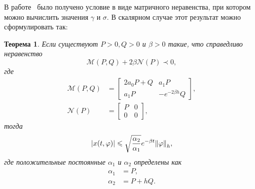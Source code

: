 \documentclass[a4paper,14pt]{article}
\newtheorem{theorem}{Теорема}
\begin{document}
В работе~\cite{modie2005} было получено условие в виде матричного неравенства,
при котором можно вычислить значения $\gamma$ и $\sigma$. В скалярном случае этот
результат можно сформулировать так:
\begin{theorem}\label{th:modie}
  Если существуют $P > 0, Q > 0$ и $\beta > 0$ такие, что
  справедливо неравенство
  \begin{equation}
    \label{eq:lmi}
    \mathcal{M}(P, Q) + 2 \beta \mathcal{N}(P) \prec 0,
  \end{equation}
  где
  \begin{equation*}
    \begin{aligned}
      \mathcal{M}(P, Q)
      &=
        \begin{bmatrix}
          2 a_0 P + Q & a_1 P \\
          a_1 P & - e^{-2 \beta h} Q
        \end{bmatrix}, \\
      \mathcal{N}(P)
      &=
        \begin{bmatrix}
          P & 0 \\
          0 & 0
        \end{bmatrix},
    \end{aligned}
  \end{equation*}
  тогда
  \begin{equation*}
    \abs{x(t, \varphi)} \leqslant \sqrt{ \frac{\alpha_2}{\alpha_1} } e^{-\beta t} \norm{\varphi}_h,
  \end{equation*}
  где положительные постоянные $\alpha_1$ и $\alpha_2$ определены как
  \begin{equation*}
    \begin{aligned}
      \alpha_1 &= P, \\
      \alpha_2 &= P + h Q.
    \end{aligned}
  \end{equation*}
\end{theorem}
\end{document}
